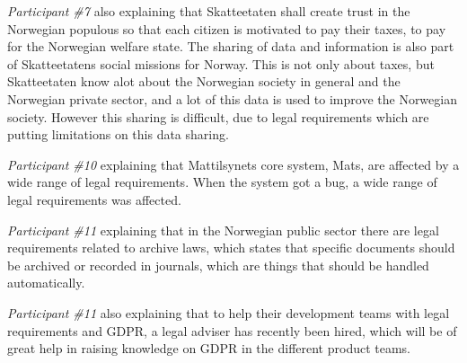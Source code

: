 \textit{Participant \#7} also explaining that Skatteetaten shall create trust in the Norwegian populous so that each citizen is motivated to pay their taxes, to pay for the Norwegian welfare state. The sharing of data and information is also part of Skatteetatens social missions for Norway. This is not only about taxes, but Skatteetaten know alot about the Norwegian society in general and the Norwegian private sector, and a lot of this data is used to improve the Norwegian society. However this sharing is difficult, due to legal requirements which are putting limitations on this data sharing.

\textit{Participant \#10} explaining that Mattilsynets core system, Mats, are affected by a wide range of legal requirements. When the system got a bug, a wide range of legal requirements was affected.

\textit{Participant \#11} explaining that in the Norwegian public sector there are legal requirements related to archive laws, which states that specific documents should be archived or recorded in journals, which are things that should be handled automatically.

\textit{Participant \#11} also explaining that to help their development teams with legal requirements and GDPR, a legal adviser has recently been hired, which will be of great help in raising knowledge on GDPR in the different product teams.
